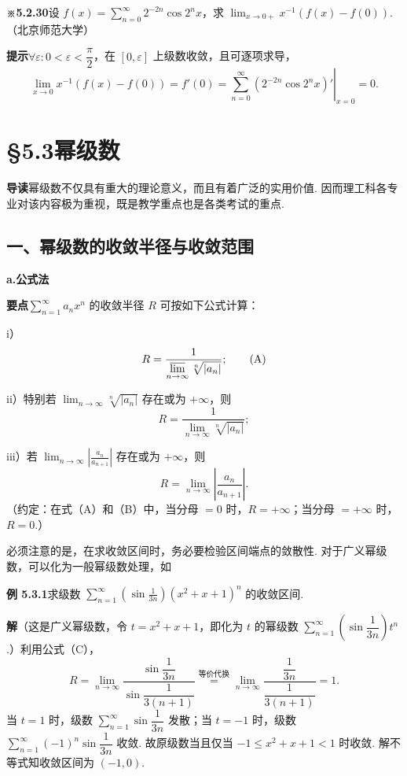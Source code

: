 \documentclass[UTF8,12pt,a4paper,fontset=fandol]{ctexart}
\begin{document}
\noindent\textbf{※5.2.30}\quad 设 $f(x)=\displaystyle\sum_{n=0}^{\infty}2^{-2n}\cos 2^nx$，求
$\displaystyle\lim_{x\to0+}x^{-1}(f(x)-f(0))$.（北京师范大学）

\noindent\textbf{提示}\quad $\forall\varepsilon:0<\varepsilon<\dfrac\pi2$，在 $[0,\varepsilon]$ 上级数收敛，且可逐项求导，
\[
  \lim_{x\to0}x^{-1}(f(x)-f(0))=f'(0)
  =\left.\sum_{n=0}^{\infty}(2^{-2n}\cos2^nx)'\right|_{x=0}=0.
\]

\section*{§5.3\quad 幂级数}

\noindent\textbf{导读}\quad 幂级数不仅具有重大的理论意义，而且有着广泛的实用价值. 因而理工科各专业对该内容极为重视，既是教学重点也是各类考试的重点.

\subsection*{一、幂级数的收敛半径与收敛范围}

\noindent\textbf{a.\quad 公式法}

\noindent\textbf{要点}\quad $\displaystyle\sum_{n=1}^{\infty}a_nx^n$ 的收敛半径 $R$ 可按如下公式计算：

i）
\[
  R=\frac1{\displaystyle\varlimsup_{n\to\infty}\sqrt[n]{|a_n|}};
\tag{A}
\]

ii）特别若 $\displaystyle\lim_{n\to\infty}\sqrt[n]{|a_n|}$ 存在或为 $+\infty$，则
\[
  R=\frac1{\displaystyle\lim_{n\to\infty}\sqrt[n]{|a_n|}};
\tag{B}
\]

iii）若 $\displaystyle\lim_{n\to\infty}\left|\frac{a_n}{a_{n+1}}\right|$ 存在或为 $+\infty$，则
\[
  R=\lim_{n\to\infty}\left|\frac{a_n}{a_{n+1}}\right|.
\tag{C}
\]
（约定：在式（A）和（B）中，当分母 $=0$ 时，$R=+\infty$；当分母 $=+\infty$ 时，$R=0$.）

必须注意的是，在求收敛区间时，务必要检验区间端点的敛散性. 对于广义幂级数，可以化为一般幂级数处理，如

\noindent\textbf{例 5.3.1}\quad 求级数
$\displaystyle\sum_{n=1}^{\infty}\left(\sin\frac1{3n}\right)(x^2+x+1)^n$ 的收敛区间.

\noindent\textbf{解}\quad （这是广义幂级数，令 $t=x^2+x+1$，即化为 $t$ 的幂级数
$\displaystyle\sum_{n=1}^{\infty}\left(\sin\dfrac1{3n}\right)t^n$.）利用公式（C），
\[
  R=\lim_{n\to\infty}\frac{\sin\dfrac1{3n}}{\sin\dfrac1{3(n+1)}}
  \overset{\text{等价代换}}=
  \lim_{n\to\infty}\frac{\dfrac1{3n}}{\dfrac1{3(n+1)}}=1.
\]
当 $t=1$ 时，级数 $\displaystyle\sum_{n=1}^{\infty}\sin\dfrac1{3n}$ 发散；当 $t=-1$ 时，级数
$\displaystyle\sum_{n=1}^{\infty}(-1)^n\sin\dfrac1{3n}$ 收敛. 故原级数当且仅当
$-1\le x^2+x+1<1$ 时收敛. 解不等式知收敛区间为 $(-1,0)$.
\end{document}
